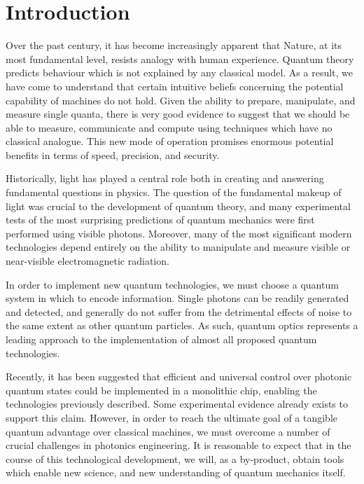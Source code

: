 \chapter{Introduction}

Over the past century, it has become increasingly apparent that Nature, at its most fundamental level, resists analogy with human experience. Quantum theory predicts behaviour which is not explained by any classical model. As a result, we have come to understand that certain intuitive beliefs concerning the potential capability of machines do not hold.  Given the ability to prepare, manipulate, and measure single quanta, there is very good evidence to suggest that we should be able to measure, communicate and compute using techniques which have no classical analogue. This new mode of operation promises enormous potential benefits in terms of speed, precision, and security.

Historically, light has played a central role both in creating and answering fundamental questions in physics. The question of the fundamental makeup of light was crucial to the development of quantum theory, and many experimental tests of the most surprising predictions of quantum mechanics were first performed using visible photons.  Moreover, many of the most significant modern technologies depend entirely on the ability to manipulate and measure visible or near-visible electromagnetic radiation. 

In order to implement new quantum technologies, we must choose a quantum system in which to encode information. Single photons can be readily generated and detected, and generally do not suffer from the detrimental effects of noise to the same extent as other quantum particles. As such, quantum optics represents a leading approach to the implementation of almost all proposed quantum technologies. 

Recently, it has been suggested that efficient and universal control over photonic quantum states could be implemented in a monolithic chip, enabling the technologies previously described. Some experimental evidence already exists to support this claim. However, in order to reach the ultimate goal of a tangible quantum advantage over classical machines, we must overcome a number of crucial challenges in photonics engineering. It is reasonable to expect that in the course of this technological development, we will, as a by-product, obtain tools which enable new science, and new understanding of quantum mechanics itself.

